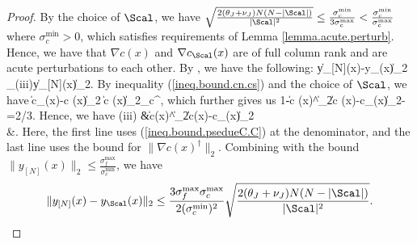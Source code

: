 \begin{proof}
By the choice of $\Scal$, we have $\sqrt{ \frac{2(\theta_J+\nu_J)N(N-|\Scal|)}{|\Scal|^2}}\le \frac{\sigma_c^{\min}}{3\sigma_c^{\max}}<\frac{\sigma_c^{\min}}{\sigma_c^{\max}}$ where $\sigma_c^{\min}>0$, which satisfies requirements of Lemma \ref{lemma.acute.perturb}. Hence, we have that $\nabla c (x)$ and $\nabla c_\Scal(x)$ are of full column rank and are acute perturbations to each other. By \cite[Theorem 5.2]{396bf6e1-ef54-3bf6-a49b-862db8404076}, we have the following:
\bequation
\label{ineq.define.iii}
	\|y_{[N]}(x)-y_\Scal(x)\|_2
	\le {}_{(iii)}\|y_{[N]}(x)\|_2.
\eequation
	By inequality (\ref{ineq.bound.cn.cs}) and the choice of $\Scal$, we have
	\bequationNN
	\|\nabla c_\Scal(x)-\nabla c (x)\|_2
	\le{}\|\nabla c (x)\|_2\le {}\sigma_c^{\min},
\eequationNN
which further gives us
	\bequation
	\label{ineq.bound.psedueC.C}
		1-\|\nabla c (x)^\dag\|_2\|\nabla c (x)-\nabla c_\Scal(x)\|_2-=2/3.
	\eequation
	Hence, we have
	\bequation
	\label{ineq.bound.psi}
	\baligned
	(iii)
	&\le {}\|\nabla c(x)^\dag\|_2\|\nabla c(x)-\nabla c_\Scal(x)\|_2\\
	&\le {}.
\ealigned
\eequation
Here, the first line uses (\ref{ineq.bound.psedueC.C}) at the denominator, and the last line uses the bound for $\|\nabla c(x)^\dag\|_2$. Combining with the bound $\|y_{[N]}(x)\|_2\le\frac{\sigma_f^{\max}}{\sigma_c^{\min}}$, we have
	\[
	\|y_{[N]}(x)-y_\Scal(x)\|_2
	 \le \frac{3\sigma_f^{\max}\sigma_c^{\max}}{2 (\sigma_c^{\min})^2}\sqrt{ \frac{2(\theta_J+\nu_J)N(N-|\Scal|)}{|\Scal|^2}}.
	\]
	
\end{proof}

